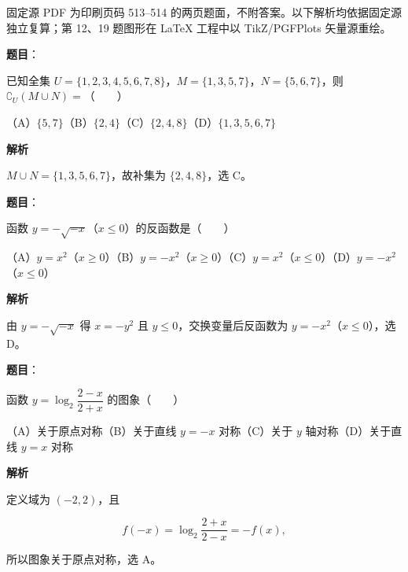 

\begin{gktip}
固定源 PDF 为印刷页码 513–514 的两页题面，不附答案。以下解析均依据固定源独立复算；第 12、19 题图形在 LaTeX 工程中以 TikZ/PGFPlots 矢量源重绘。
\end{gktip}

\begin{answer}

\textbf{题目}：

已知全集 $U=\{1,2,3,4,5,6,7,8\}$，$M=\{1,3,5,7\}$，$N=\{5,6,7\}$，则 $\complement_U(M\cup N)=$\mbox{（　　）}

（A）$\{5,7\}$\quad（B）$\{2,4\}$\quad（C）$\{2,4,8\}$\quad（D）$\{1,3,5,6,7\}$

\textbf{解析}

$M\cup N=\{1,3,5,6,7\}$，故补集为 $\{2,4,8\}$，选 C。


\end{answer}
\begin{answer}

\textbf{题目}：

函数 $y=-\sqrt{-x}$（$x\leqslant0$）的反函数是\mbox{（　　）}

（A）$y=x^2$（$x\geqslant0$）\quad（B）$y=-x^2$（$x\geqslant0$）\quad（C）$y=x^2$（$x\leqslant0$）\quad（D）$y=-x^2$（$x\leqslant0$）

\textbf{解析}

由 $y=-\sqrt{-x}$ 得 $x=-y^2$ 且 $y\leqslant0$，交换变量后反函数为
$y=-x^2$（$x\leqslant0$），选 D。


\end{answer}
\begin{answer}

\textbf{题目}：

函数 $y=\log_2\dfrac{2-x}{2+x}$ 的图象\mbox{（　　）}

（A）关于原点对称\quad（B）关于直线 $y=-x$ 对称\quad（C）关于 $y$ 轴对称\quad（D）关于直线 $y=x$ 对称

\textbf{解析}

定义域为 $(-2,2)$，且

\nopagebreak[4]
\[
f(-x)=\log_2\frac{2+x}{2-x}=-f(x),
\]

所以图象关于原点对称，选 A。


\end{answer}
